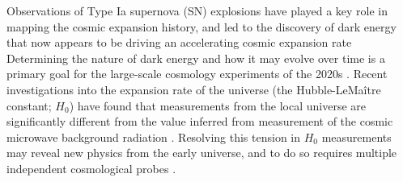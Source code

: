 \documentclass[12pt]{article}
\begin{document}



Observations of Type Ia supernova (SN) explosions have played a key role in mapping the cosmic expansion history, and led to the discovery of dark energy that now appears to be driving an accelerating cosmic expansion rate 
\cite{riess_observational_1998,perlmutter_measurements_1999} %
Determining the nature of dark energy and how it may evolve over time is a primary goal for the large-scale cosmology experiments of the 2020s
\cite{amendola_cosmology_2013,spergel_wide_2015,Ivezic_lsst_2019}.
 Recent investigations into the expansion rate of the universe (the Hubble-LeMa\^itre constant; $H_0$) have found that measurements from the local universe are significantly different from the value inferred from measurement of the cosmic microwave background  radiation \cite{Riess_large_2019,aghanim_planck_2018}.  Resolving this tension in $H_0$ measurements may reveal new physics from the early universe, and to do so requires multiple 
independent cosmological probes \cite{verde_tensions_2019}.
\end{document}

